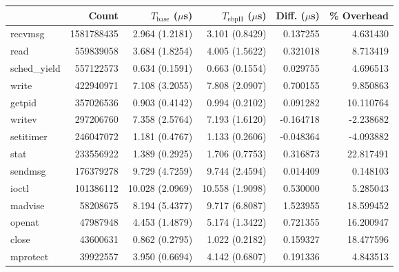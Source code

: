 \begin{tabular}{>{\ttfamily}lrrrrr}
\toprule
\multicolumn{1}{l}{System Call} &       Count & $T_\text{base}$ ($\mu$s) & $T_\text{ebpH}$ ($\mu$s) &  Diff. ($\mu$s) &  \% Overhead \\
\midrule
                        recvmsg &  1581788435 &           2.964 (1.2181) &           3.101 (0.8429) &        0.137255 &     4.631430 \\
                           read &   559839058 &           3.684 (1.8254) &           4.005 (1.5622) &        0.321018 &     8.713419 \\
                   sched\_yield &   557122573 &           0.634 (0.1591) &           0.663 (0.1554) &        0.029755 &     4.696513 \\
                          write &   422940971 &           7.108 (3.2055) &           7.808 (2.0907) &        0.700155 &     9.850863 \\
                         getpid &   357026536 &           0.903 (0.4142) &           0.994 (0.2102) &        0.091282 &    10.110764 \\
                         writev &   297206760 &           7.358 (2.5764) &           7.193 (1.6120) &       -0.164718 &    -2.238682 \\
                      setitimer &   246047072 &           1.181 (0.4767) &           1.133 (0.2606) &       -0.048364 &    -4.093882 \\
                           stat &   233556922 &           1.389 (0.2925) &           1.706 (0.7753) &        0.316873 &    22.817491 \\
                        sendmsg &   176379278 &           9.729 (4.7259) &           9.744 (2.4594) &        0.014409 &     0.148103 \\
                          ioctl &   101386112 &          10.028 (2.0969) &          10.558 (1.9098) &        0.530000 &     5.285043 \\
                        madvise &    58208675 &           8.194 (5.4377) &           9.717 (6.8087) &        1.523955 &    18.599452 \\
                         openat &    47987948 &           4.453 (1.4879) &           5.174 (1.3422) &        0.721355 &    16.200947 \\
                          close &    43600631 &           0.862 (0.2795) &           1.022 (0.2182) &        0.159327 &    18.477596 \\
                       mprotect &    39922557 &           3.950 (0.6694) &           4.142 (0.6807) &        0.191336 &     4.843513 \\

\end{tabular}

